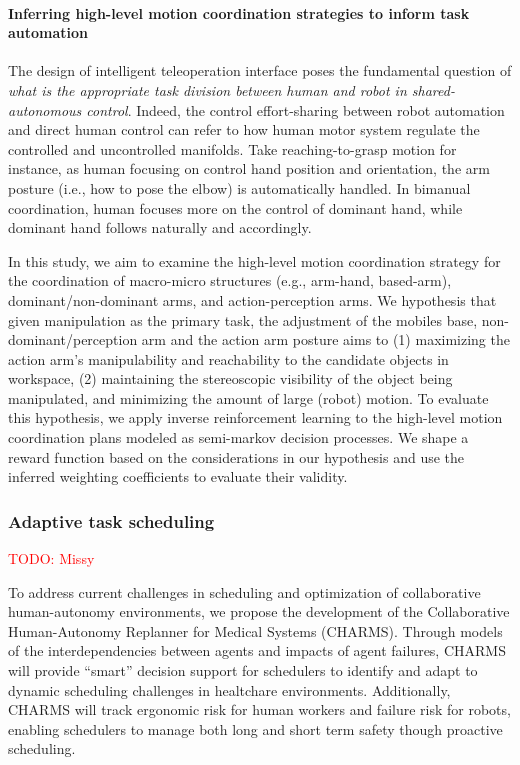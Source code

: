 \paragraph{Inferring high-level motion coordination strategies to inform task automation}
The design of intelligent teleoperation interface poses the fundamental question of \textit{what is the appropriate task division between human and robot in shared-autonomous control}. Indeed, the control effort-sharing between robot automation and direct human control can refer to how human motor system regulate the controlled and uncontrolled manifolds. Take reaching-to-grasp motion for instance, as human focusing on control hand position and orientation, the arm posture (i.e., how to pose the elbow) is automatically handled. In bimanual coordination, human focuses more on the control of dominant hand, while dominant hand follows naturally and accordingly. 

In this study, we aim to examine the high-level motion coordination strategy for the coordination of macro-micro structures (e.g., arm-hand, based-arm), dominant/non-dominant arms, and action-perception arms. We hypothesis that given manipulation as the primary task, the adjustment of the mobiles base, non-dominant/perception arm and the action arm posture aims to (1) maximizing the action arm's manipulability and reachability to the candidate objects in workspace, (2) maintaining the stereoscopic visibility of the object being manipulated, and minimizing the amount of large (robot) motion. To evaluate this hypothesis, we apply inverse reinforcement learning to the high-level motion coordination plans modeled as semi-markov decision processes. We shape a reward function based on the considerations in our hypothesis and use the inferred weighting coefficients to evaluate their validity.  

\subsubsection{Adaptive task scheduling}
\textcolor{red}{TODO: Missy}

To address current challenges in scheduling and optimization of collaborative human-autonomy environments, we propose the development of the Collaborative Human-Autonomy Replanner for Medical Systems (CHARMS). Through models of the interdependencies between agents and impacts of agent failures, CHARMS will provide ``smart'' decision support for schedulers to identify and adapt to dynamic scheduling challenges in healtchare environments. Additionally, CHARMS will track ergonomic risk for human workers and failure risk for robots, enabling schedulers to manage both long and short term safety though proactive scheduling. 

